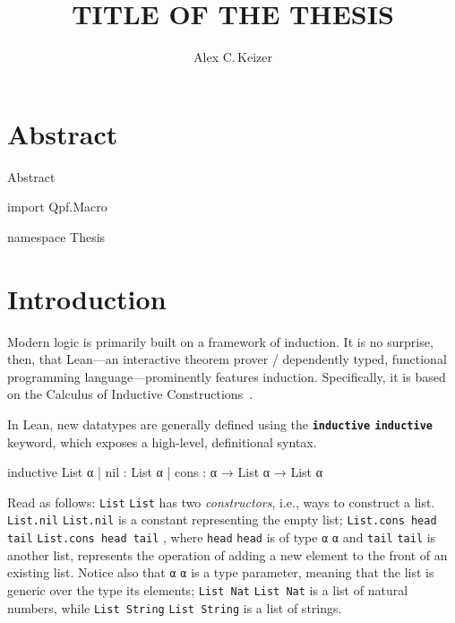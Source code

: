 \documentclass[titlepage]{report}
\newenvironment{todo}{%
\definecolor{shadecolor}{HTML}{F8E0E0}%
\begin{shaded}%
\begin{trivlist}                         
    \item[\hskip \labelsep {\bfseries Todo:}]}{\end{trivlist}\end{shaded}}
\newenvironment{leanhidden}{\expandafter\comment}{\expandafter\endcomment}
\newcommand\lean[1]{%
\ifx\leanmode\undefined%
\def\leanmode{1}%
\texttt{\small #1}%
\undef\leanmode%
\else%
\texttt{#1}%
\fi%
}
\newcommand\keyword[1]{{\color{keywordcolor} \textbf{\lean{#1}}}}
\newcommand\inductive{{\keyword{inductive}}}
\begin{document}
%
%
\title{TITLE OF THE THESIS}
\author{Alex C.\,Keizer}
\maketitle


\chapter*{Abstract}
\begin{todo}
    Abstract
\end{todo}

\tableofcontents


\begin{leanhidden}
    import Qpf.Macro

    namespace Thesis
\end{leanhidden}

%
%
\chapter{Introduction}
\label{ch:intro}

Modern logic is primarily built on a framework of induction.
It is no surprise, then, that Lean---an interactive theorem prover / dependently typed, functional programming language---prominently features induction.
Specifically, it is based on the Calculus of Inductive Constructions~\cite{avigadTheoremProvingLean}.

In Lean, new datatypes are generally defined using the \inductive{} keyword, which exposes a high-level, definitional syntax.

\begin{leancode}
  inductive List α 
    | nil  : List α
    | cons : α → List α → List α
\end{leancode}

Read as follows: \lean{List} has two \emph{constructors}, i.e., ways to construct a list.
\lean{List.nil} is a constant
representing the empty list; 
\lean{List.cons head tail}, where \lean{head} is of type \lean{α} and \lean{tail} is another list, represents the operation of adding a new element to the front of an existing list. Notice also that \lean{α} is a type parameter, meaning that the list is generic over the type its elements; \lean{List Nat} is a list of natural numbers, while \lean{List String} is a list of strings.
\end{document}
